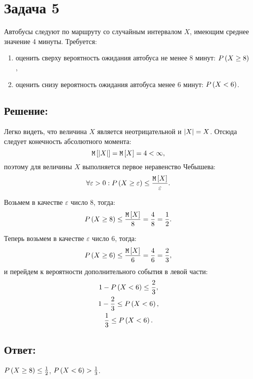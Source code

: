 \section*{Задача 5}

Автобусы следуют по маршруту со случайным интервалом $X$, имеющим среднее значение 4 минуты. Требуется:
\begin{enumerate}
    \item оценить сверху вероятность ожидания автобуса не менее 8 минут: $P \left ( X \ge 8 \right )$ ,
    \item оценить снизу вероятность ожидания автобуса менее 6 минут: $P \left ( X < 6 \right )$.
\end{enumerate}

\subsection*{Решение:}
Легко видеть, что величина $X$ является неотрицательной и $\left | X \right | = X$. Отсюда следует конечность абсолютного момента:
\begin{equation}
    \mathtt{M} \left [ \left | X \right | \right ] = \mathtt{M} \left [ X \right ] = 4 < \infty ,
\end{equation}
поэтому для величины $X$ выполняется первое неравенство Чебышева:
\begin{equation}
    \forall \varepsilon > 0 : P \left ( X \ge \varepsilon \right ) \le \frac{\mathtt{M} \left [ X \right ]}{\varepsilon} .
\end{equation}

Возьмем в качестве $\varepsilon$ число 8, тогда:
\begin{equation}
    P \left ( X \ge 8 \right ) \le \frac{\mathtt{M} \left [ X \right ]}{8} = \frac{4}{8} = \frac{1}{2}.
\end{equation}

Теперь возьмем в качестве $\varepsilon$ число 6, тогда:
\begin{equation}
    P \left ( X \ge 6 \right ) \le \frac{\mathtt{M} \left [ X \right ]}{6} = \frac{4}{6} = \frac{2}{3} ,
\end{equation}
и перейдем к вероятности дополнительного события в левой части:
\begin{gather}
    1 - P \left ( X < 6 \right ) \le \frac{2}{3} , \\
    1 - \frac{2}{3} \le P \left ( X < 6 \right ) , \\
    \frac{1}{3} \le P \left ( X < 6 \right ) .
\end{gather}

\subsection*{Ответ:}
$P \left ( X \ge 8 \right ) \le \frac{1}{2}$, $P \left ( X < 6 \right ) > \frac{1}{3}$.

